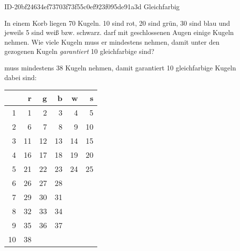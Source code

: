 \begin{exercise}
      {ID-20bf24634ef73703f73f55c0ef923f095de91a3d}
      {Gleichfarbig}
  \ifproblem\problem\par
    In einem Korb liegen 70 Kugeln. 10 sind rot, 20 sind grün, 30 sind blau
    und jeweils 5 sind weiß bzw. schwarz. \xya{} darf mit geschlossenen Augen
    einige Kugeln nehmen. Wie viele Kugeln muss er mindestens nehmen, damit
    unter den gezogenen Kugeln \emph{garantiert} 10 gleichfarbige sind?
  \fi
  \ifoutcome\outcome\par
    \xya{} muss mindestens 38 Kugeln nehmen, damit garantiert 10 gleichfarbige Kugeln
    dabei sind:
    \begin{center}
      \begin{tabular}{r|rrrrr}
          &  r &  g &  b &  w &  s \\
      \hline
         1 &  1 &  2 &  3 &  4 &  5 \\
         2 &  6 &  7 &  8 &  9 & 10 \\
         3 & 11 & 12 & 13 & 14 & 15 \\
         4 & 16 & 17 & 18 & 19 & 20 \\
         5 & 21 & 22 & 23 & 24 & 25 \\
      \hline
         6 & 26 & 27 & 28 &    &    \\
         7 & 29 & 30 & 31 &    &    \\
         8 & 32 & 33 & 34 &    &    \\
         9 & 35 & 36 & 37 &    &    \\
      \hline
        10 & 38 &    &    &    &    \\
      \hline
      \end{tabular}
    \end{center}
  \fi
\end{exercise}
